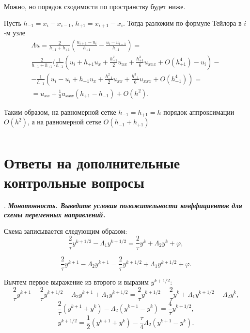 \documentclass[12pt, a4paper]{article}
\newcounter{mycounter}
\newcommand{\quastion}[1]{%
	\stepcounter{mycounter}%
	\textbf{\themycounter}.  %
	\textbf{\textit{#1}}
	
}
\begin{document}
	Можно, но порядок сходимости по пространству будет ниже. 
	
	Пусть $h_{-1} = x_i - x_{i-1}$, $h_{+1} = x_{i+1} - x_i$. Тогда разложим по формуле Тейлора в $i$-м узле
	\begin{multline*}
		 \Lambda u = \frac{2}{h_{-1} + h_{+1}} (\frac{u_{i+1} - u_i}{h_{+1}} - \frac{u_{i} - u_{i-1}}{h_{-1}}) = \\
		  \frac{2}{h_{-1} + h_{+1}} (\frac{1}{h_{-1}} (u_i + h_{+1} u_x + \frac{h^2_{+1}}{2} u_{xx} + \frac{h^3_{+1}}{6} u_{xxx} + O(h^4_{+1}) - u_i) - \\
		 - \frac{1}{h_{-1}} (u_i - u_i + h_{-1} u_x + \frac{h^2_{-1}}{2} u_{xx} + \frac{h^3_{-1}}{6} u_{xxx} + O(h^4_{-1})) = \\
		 = u_{xx} + \frac{1}{3}u_{xxx}(h_{+1}-h_{-1}) + O(h^2).
	\end{multline*}
	
	Таким образом, на равномерной сетке $h_{-1} = h_{+1} = h$ порядок аппроксимации $O(h^2)$, а на равномерной сетке $O(h_{-1}+h_{+1})$
	
	\begin{equation*} 
	\end{equation*}
\bigskip
	\section{Ответы на дополнительные контрольные вопросы}
	\quastion{Монотонность. Выведите условия положительности коэффициентов для схемы переменных направлений.}
	
	Схема записывается следующим образом:
	\begin{equation*}
		\frac{2}{\tau} y^{k+1/2} - \Lambda_1 y^{k+1/2} = \frac{2}{\tau} y^k + \Lambda_2 y^k + \varphi,
	\end{equation*}
	
	\begin{equation*}
		\frac{2}{\tau} y^{k+1} - \Lambda_2 y^{k+1} = \frac{2}{\tau} y^{k+1/2} + \Lambda_1 y^{k+1/2} + \varphi.
	\end{equation*}
	
	Вычтем первое выражение из второго и выразим $y^{k+1/2}$:
	\begin{equation*}
		\frac{2}{\tau} y^{k+1} - \frac{2}{\tau} y^{k+1/2} - \Lambda_2 y^{k+1} + \Lambda_1 y^{k+1/2} = \frac{2}{\tau} y^{k+1/2} - \frac{2}{\tau} y^k + \Lambda_1 y^{k+1/2} - \Lambda_2 y^k,
	\end{equation*}
	\begin{equation*}
		\frac{2}{\tau} (y^{k+1} + y^k) - \Lambda_2 (y^{k+1} - y^k) = \frac{4}{\tau} y^{k+1/2},
	\end{equation*}
	\begin{equation*}
		y^{k+1/2} = \frac{1}{2} (y^{k+1} + y^k) - \frac{\tau}{4} \Lambda_2 (y^{k+1} - y^k).
	\end{equation*}
	
\end{document}

